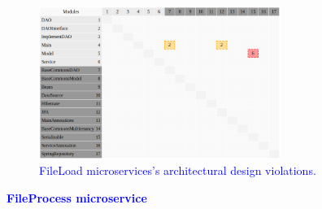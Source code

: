 \documentclass[12pt]{article}
\begin{document}
\begin{figure}[ht]
\centering
\includegraphics[width=0.7\textwidth]{figuras/violacoesFileLoad.png}
\vspace{-0.2cm}
\caption{\textcolor{blue}{FileLoad microservices's architectural design violations.}}
\label{fig:microservices}
\end{figure}

\noindent\textbf{\large{\textcolor{blue}{FileProcess microservice}}}
\label{sec:ApendiceFileProccess}
\end{document}
